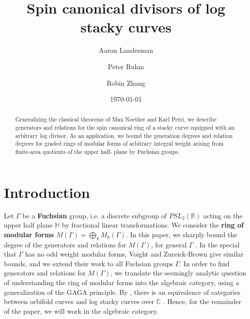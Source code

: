 \documentclass{amsart}
\title{Spin canonical divisors of log stacky curves}
\author{Aaron Landesman}
\author{Peter Ruhm}
\author{Robin Zhang}
\date{\today}
\theoremstyle{plain}
\theoremstyle{definition}
\theoremstyle{remark}
\numberwithin{equation}{section}
\newcommand\bh{{\mathbb H}}
\newcommand\BC{{\mathbb C}}
\newcommand\BR{{\mathbb R}}
\begin{document}
\maketitle

\begin{abstract}
  Generalizing the classical theorems of Max Noether and Karl 
	Petri, we describe generators and relations for the spin canonical
	ring of a stacky curve equipped with an arbitrary log divisor. As
	an application, we bound the generation degrees and relation
	degrees for graded rings of modular forms of arbitrary integral
	weight arising from finite-area quotients of the upper half-
	plane by Fuchsian groups.
\end{abstract}



\section{Introduction}
Let $\Gamma$ be a {\bf Fuchsian} group,  i.e. a discrete subgroup
of $PSL_2(\BR)$ acting on the upper half plane $\bh$ by fractional
linear transformations. We consider the {\bf ring of modular forms}
$M(\Gamma) = \bigoplus_k M_k(\Gamma)$. In this paper, we sharply bound the degree of the generators and
relations for $M(\Gamma)$, for general $\Gamma$   .  In the special that $\Gamma$ has no odd weight modular forms, Voight and Zureick-Brown
\cite[Chapters 7-9]{vzb:stacky} give similar bounds, and we extend their work to all Fuchsian groups $\Gamma$. In order to find generators and relations for $M(\Gamma)$, we translate the seemingly analytic question of understanding the ring of modular forms into the algebraic
category, using a generalization of the GAGA principle. By
\cite[Proposition 6.1.5]{vzb:stacky}, there is an equivalence of
categories between orbifold curves and log stacky curves over $\BC$
. Hence, for the remainder of the paper, we will work in the
algebraic category.
\end{document}
